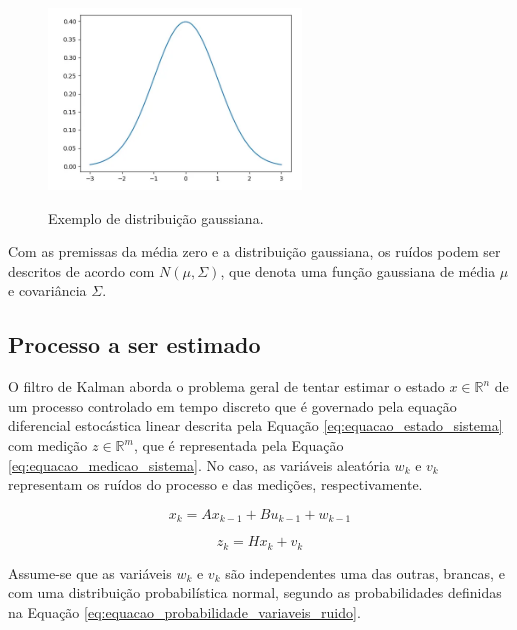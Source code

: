 \documentclass[acronym, symbols]{fei}
\begin{document}
				\begin{figure}[!htb]
					\centering
					\caption{Exemplo de distribuição gaussiana.} 
					\includegraphics[width=0.6\textwidth]{distribuicao_gaussiana.png}
					\label{fig:distribuicao_gaussiana}
				\end{figure}
			
				Com as premissas da média zero e a distribuição gaussiana, os ruídos podem ser descritos de acordo com $N(\mu,\Sigma)$, que denota uma função gaussiana de média $\mu$ e covariância $\Sigma$.
		
		\subsection{Processo a ser estimado}
		
			O filtro de Kalman aborda o problema geral de tentar estimar o estado $x \in \mathbb{R}^n$ de um processo controlado em tempo discreto que é governado pela equação diferencial estocástica linear descrita pela Equação \eqref{eq:equacao_estado_sistema} com medição $z \in \mathbb{R}^m$, que é representada pela Equação \eqref{eq:equacao_medicao_sistema}. No caso, as variáveis aleatória $w_k$ e $v_k$ representam os ruídos do processo e das medições, respectivamente.
			
			\begin{equation} \label{eq:equacao_estado_sistema}
				x_k = Ax_{k-1} + Bu_{k-1} + w_{k-1}
			\end{equation}
		
			\begin{equation} \label{eq:equacao_medicao_sistema}
				z_k = Hx_k + v_k
			\end{equation}
		
			Assume-se que as variáveis $w_k$ e $v_k$ são independentes uma das outras, brancas, e com uma distribuição probabilística normal, segundo as probabilidades definidas na Equação \eqref{eq:equacao_probabilidade_variaveis_ruido}.
			
\end{document}
